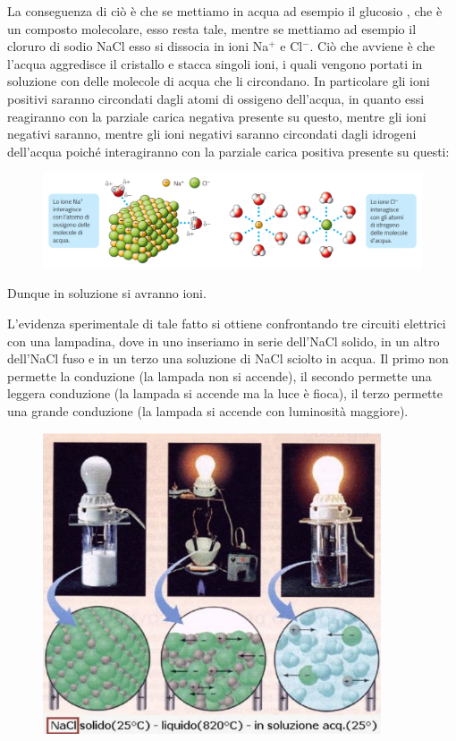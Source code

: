 La conseguenza di ciò è che se mettiamo in acqua ad esempio il glucosio , che è un composto molecolare, esso resta tale, mentre se mettiamo ad esempio il cloruro di sodio NaCl esso si dissocia in ioni Na$^+$ e Cl$^-$. Ciò che avviene è che l'acqua aggredisce il cristallo e stacca singoli ioni, i quali vengono portati in soluzione con delle molecole di acqua che li circondano. In particolare gli ioni positivi saranno circondati dagli atomi di ossigeno dell'acqua, in quanto essi reagiranno con la parziale carica negativa presente su questo, mentre gli ioni negativi saranno, mentre gli ioni negativi saranno circondati dagli idrogeni dell'acqua poiché interagiranno con la parziale carica positiva presente su questi:
\begin{figure}[htp]
    \centering
    \includegraphics[width=15cm]{immagini/interazione-acqua-ioni.png}
\end{figure}
Dunque in soluzione si avranno ioni.

L'evidenza sperimentale di tale fatto si ottiene confrontando tre circuiti elettrici con una lampadina, dove in uno inseriamo in serie dell'NaCl solido, in un altro dell'NaCl fuso e in un terzo una soluzione di NaCl sciolto in acqua. Il primo non permette la conduzione (la lampada non si accende), il secondo permette una leggera conduzione (la lampada si accende ma la luce è fioca), il terzo permette una grande conduzione (la lampada si accende con luminosità maggiore).

\begin{figure}[htp]
    \centering
    \includegraphics[width=10cm]{immagini/lampadina.png}
\end{figure}

